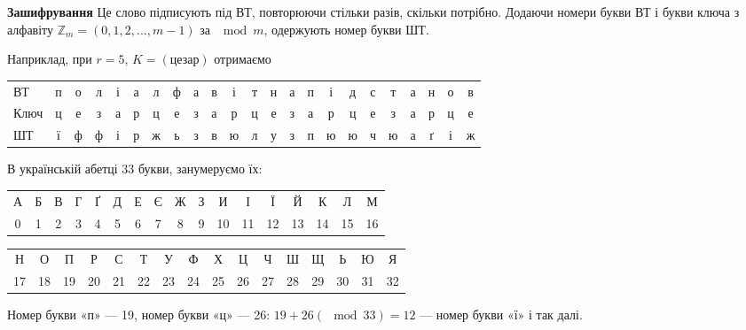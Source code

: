 \textbf{Зашифрування}
Це слово підписують під ВТ, повторюючи стільки
разів, скільки потрібно. Додаючи номери букви ВТ і букви ключа з алфавіту
$\mathbb{Z}_m = (0, 1, 2, ..., m-1)$ за $\mod m$, одержують номер букви ШТ.

\begin{example}
    Наприклад, при $r = 5$, $K=(\text{цезар})$ отримаємо
    
    \begin{center}
        \scriptsize
        \begin{tabular}{lccccc|ccccc|ccccc|ccccc|cc}
            ВТ   & п & о & л & і & а & л & ф & а & в & і & т & н & а & п & і & д & с & т & а & н & о & в  \\
            Ключ & ц & е & з & а & р & ц & е & з & а & р & ц & е & з & а & р & ц & е & з & а & р & ц & е  \\
            ШТ   & ї & ф & ф & і & р & ж & ь & з & в & ю & л & у & з & п & ю & ю & ч & ю & а & ґ & і & ж  \\
        \end{tabular}
    \end{center}

    В українській абетці 33 букви, занумеруємо їх:
    
    \begin{center}
        \begin{tabular}{|c|c|c|c|c|c|c|c|c|c|c|c|c|c|c|c|c|}
            \hline
            А & Б & В & Г & Ґ & Д & Е & Є & Ж & З & И  & І  & Ї  & Й  & К  & Л  & М  \\
            0 & 1 & 2 & 3 & 4 & 5 & 6 & 7 & 8 & 9 & 10 & 11 & 12 & 13 & 14 & 15 & 16  \\
            \hline
        \end{tabular}
    \end{center}
    
    \begin{center}
        \centering
        \begin{tabular}{|c|c|c|c|c|c|c|c|c|c|c|c|c|c|c|c|}
            \hline
            Н  & О  & П  & Р  & С  & Т  & У  & Ф  & Х  & Ц  & Ч  & Ш  & Щ  & Ь  & Ю  & Я  \\
            17 & 18 & 19 & 20 & 21 & 22 & 23 & 24 & 25 & 26 & 27 & 28 & 29 & 30 & 31 & 32  \\
            \hline
        \end{tabular}
    \end{center}
    
    Номер букви «п» --- 19, номер букви «ц» --- 26: $19 + 26 (\mod 33) = 12$ --- номер
    букви «ї» і так далі.
\end{example}

